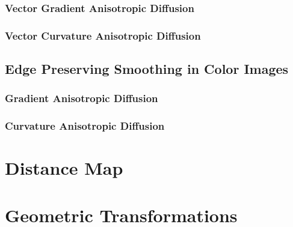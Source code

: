 \subsubsection{Vector Gradient Anisotropic Diffusion}
\label{sec:VectorGradientAnisotropicDiffusionImageFilter}

\ifitkFullVersion

\fi

\subsubsection{Vector Curvature Anisotropic Diffusion}
\label{sec:VectorCurvatureAnisotropicDiffusionImageFilter}

\ifitkFullVersion

\fi



\subsection{Edge Preserving Smoothing in Color Images}
\label{sec:ColorAnisotropicDiffusion}

\subsubsection{Gradient Anisotropic Diffusion}
\label{sec:ColorGradientAnisotropicDiffusion}

\ifitkFullVersion

\fi

\subsubsection{Curvature Anisotropic Diffusion}
\label{sec:ColorCurvatureAnisotropicDiffusion}

\ifitkFullVersion

\fi



\section{Distance Map}
\label{sec:DistanceMap}

\ifitkFullVersion

\fi

\ifitkFullVersion

\fi




\section{Geometric Transformations}
\label{sec:GeometricalTransformationFilters}

